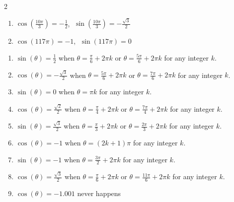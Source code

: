 \documentclass{ximera}
\begin{document}
\begin{multicols}{2}

\begin{enumerate}

\setcounter{enumi}{\value{HW}}

\item $\cos\left(\frac{10\pi}{3}\right) = -\frac{1}{2}$, $\; \sin \left(\frac{10\pi}{3}\right) = -\frac{\sqrt{3}}{2}$

\item $\cos(117\pi) = -1$, $\; \sin(117\pi) = 0$ 

\setcounter{HW}{\value{enumi}}

\end{enumerate}

\end{multicols}

\begin{enumerate}

\setcounter{enumi}{\value{HW}}

\item $\sin(\theta) = \frac{1}{2}$ when $\theta = \frac{\pi}{6} + 2\pi k$ or $\theta = \frac{5\pi}{6} + 2\pi k$ for any integer $k$.
\item $\cos(\theta) = -\frac{\sqrt{3}}{2}$ when $\theta = \frac{5\pi}{6} + 2\pi k$ or $\theta = \frac{7\pi}{6} + 2\pi k$ for any integer $k$.
\item $\sin(\theta) = 0$ when $\theta = \pi k$ for any integer $k$.
\item $\cos(\theta) = \frac{\sqrt{2}}{2}$ when $\theta = \frac{\pi}{4} + 2\pi k$ or $\theta = \frac{7\pi}{4} + 2\pi k$ for any integer $k$.
\item $\sin(\theta) = \frac{\sqrt{3}}{2}$ when $\theta = \frac{\pi}{3} + 2\pi k$ or $\theta = \frac{2\pi}{3} + 2\pi k$ for any integer $k$.
\item $\cos(\theta) = -1$ when $\theta = (2k + 1)\pi$ for any integer $k$.
\item  $\sin(\theta) = -1$ when $\theta = \frac{3\pi}{2} + 2\pi k$ for any integer $k$.
\item  $\cos(\theta) = \frac{\sqrt{3}}{2}$ when $\theta = \frac{\pi}{6} + 2\pi k$ or  $\theta = \frac{11\pi}{6} + 2\pi k$ for any integer $k$.
\item  $\cos(\theta) = -1.001$ never happens

\setcounter{HW}{\value{enumi}}

\end{enumerate}
\end{document}
